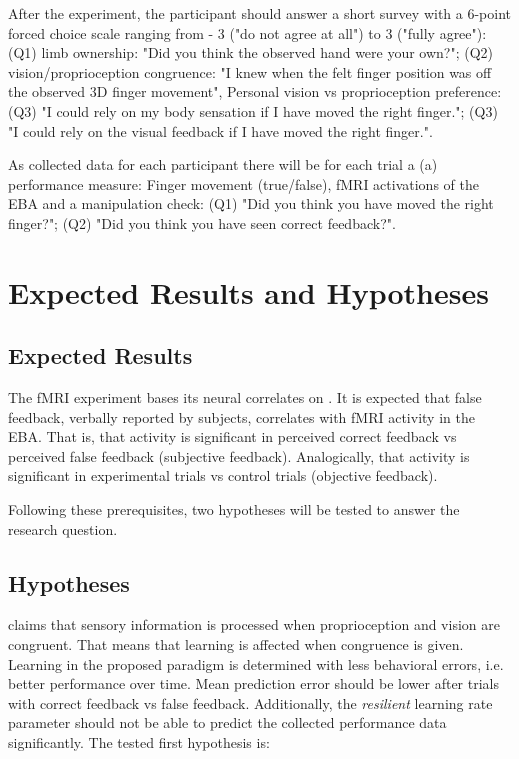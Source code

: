 \documentclass[man]{apa7}
\begin{document}
After the experiment, the participant should answer a short survey with a 6-point forced choice scale ranging from - 3 ("do not agree at all") to 3 ("fully agree"): (Q1) limb ownership: "Did you think the observed hand were your own?"; (Q2) vision/proprioception congruence: "I knew when the felt finger position was off the observed 3D finger movement", Personal vision vs proprioception preference: (Q3) "I could rely on my body sensation if I have moved the right finger."; (Q3) "I could rely on the visual feedback if I have moved the right finger.".

As collected data for each participant there will be for each trial a (a) performance measure: Finger movement (true/false), fMRI activations of the EBA and a manipulation check: (Q1) "Did you think you have moved the right finger?"; (Q2) "Did you think you have seen correct feedback?".

\section{Expected Results and Hypotheses}

\subsection{Expected Results}

The fMRI experiment bases its neural correlates on \parencite{Limanowski2016}. It is expected that false feedback, verbally reported by subjects, correlates with fMRI activity in the EBA. That is, that activity is significant in perceived correct feedback vs perceived false feedback (subjective feedback). Analogically, that activity is significant in experimental trials vs control trials (objective feedback).

Following these prerequisites, two hypotheses will be tested to answer the research question.

\subsection{Hypotheses}
\citeauthor{Limanowski2016} claims that sensory information is processed when proprioception and vision are congruent. That means that learning is affected when congruence is given. Learning in the proposed paradigm is determined with less behavioral errors, i.e. better performance over time. Mean prediction error should be lower after trials with correct feedback vs false feedback. Additionally, the \textit{resilient} learning rate parameter should not be able to predict the collected performance data significantly. The tested first hypothesis is:\\
\end{document}
